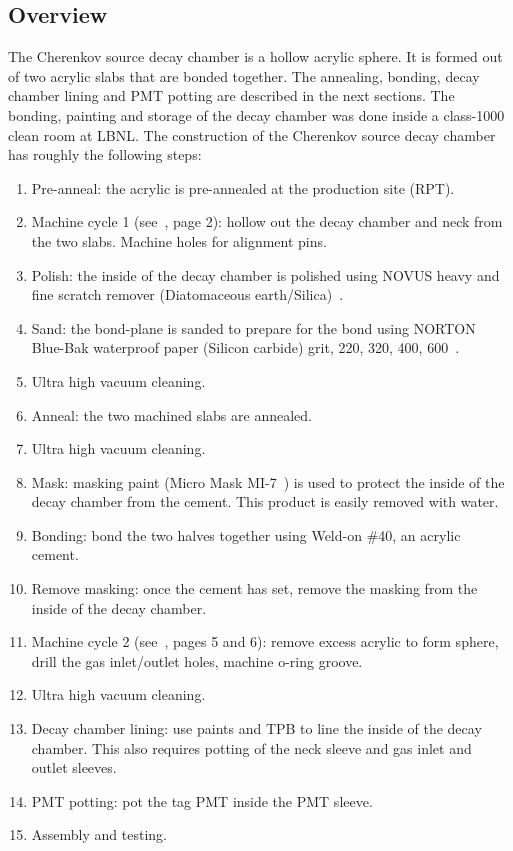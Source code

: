 \subsection{Overview}
The Cherenkov source decay chamber is a hollow acrylic sphere. It is formed out of two acrylic slabs that are bonded together. The annealing, bonding, decay chamber lining and PMT potting are described in the next sections. The bonding, painting and storage of the decay chamber was done inside a class-1000 clean room at LBNL.
The construction of the Cherenkov source decay chamber has roughly the following steps:
\begin{enumerate}
    \item Pre-anneal: the acrylic is pre-annealed at the production site (RPT).
    \item Machine cycle 1 (see~\cite{wallig:2015}, page 2): hollow out the decay chamber and neck from the two slabs. Machine holes for alignment pins. 
    \item Polish: the inside of the decay chamber is polished using NOVUS heavy and fine scratch remover (Diatomaceous earth/Silica)~\cite{polish}. 
    \item Sand: the bond-plane is sanded to prepare for the bond using NORTON Blue-Bak waterproof paper (Silicon carbide) grit, 220, 320, 400, 600~\cite{sand}.
    \item Ultra high vacuum cleaning.
    \item Anneal: the two machined slabs are annealed.
    \item Ultra high vacuum cleaning.
    \item Mask: masking paint (Micro Mask MI-7~\cite{masking}) is used to protect the inside of the decay chamber from the cement. This product is easily removed with water.
    \item Bonding: bond the two halves together using Weld-on \#40, an acrylic cement. 
    \item Remove masking: once the cement has set, remove the masking from the inside of the decay chamber.
    \item Machine cycle 2 (see~\cite{wallig:2015}, pages 5 and 6): remove excess acrylic to form sphere, drill the gas inlet/outlet holes, machine o-ring groove.
    \item Ultra high vacuum cleaning.
    \item Decay chamber lining: use paints and TPB to line the inside of the decay chamber. This also requires potting of the neck sleeve and gas inlet and outlet sleeves.
    \item PMT potting: pot the tag PMT inside the PMT sleeve.
    \item Assembly and testing.
\end{enumerate}

